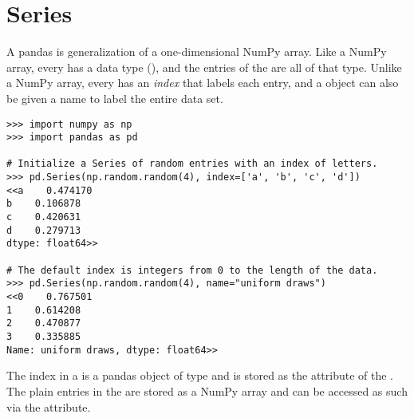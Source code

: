 \label{lab:pandas1}


\section*{Series} %

A pandas  is generalization of a one-dimensional NumPy array.
Like a NumPy array, every  has a data type (), and the entries of the  are all of that type.
Unlike a NumPy array, every  has an \emph{index} that labels each entry, and a  object can also be given a name to label the entire data set.

\begin{lstlisting}
>>> import numpy as np
>>> import pandas as pd

# Initialize a Series of random entries with an index of letters.
>>> pd.Series(np.random.random(4), index=['a', 'b', 'c', 'd'])
<<a    0.474170
b    0.106878
c    0.420631
d    0.279713
dtype: float64>>

# The default index is integers from 0 to the length of the data.
>>> pd.Series(np.random.random(4), name="uniform draws")
<<0    0.767501
1    0.614208
2    0.470877
3    0.335885
Name: uniform draws, dtype: float64>>
\end{lstlisting}

The index in a  is a pandas object of type  and is stored as the  attribute of the .
The plain entries in the  are stored as a NumPy array and can be accessed as such via the  attribute.


